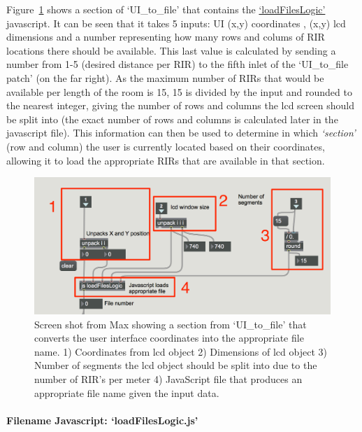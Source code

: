 \documentclass[../../main.tex]{subfiles}
\begin{document}
			Figure~\ref{locationsConvert} shows a section of `UI\_to\_file' that contains the \href{http://lt669.github.io/code/javascript/html/loadFilesLogic.html}{‘loadFilesLogic’} javascript. It can be seen that it takes 5 inputs: UI (x,y) coordinates , (x,y) lcd dimensions and a number representing how many rows and colums of \ac{RIR} locations there should be available. This last value is calculated by sending a number from 1-5 (desired distance per RIR) to the fifth inlet of the `UI\_to\_file patch' (on the far right). As the maximum number of RIRs that would be available per length of the room is 15, 15 is divided by the input and rounded to the nearest integer, giving the number of rows and columns the lcd screen should be split into (the exact number of rows and columns is calculated later in the javascript file). This information can then be used to determine in which \textit{‘section’} (row and column) the user is currently located based on their coordinates, allowing it to load the appropriate RIRs that are available in that section. 

			\begin{figure}[p]
				\centerline{\includegraphics[width=\textwidth]{Sections/Implementation/Max/images/Max/UI_to_file_edit_4.png}}
				\caption{Screen shot from Max showing a section from ‘UI\_to\_file’ that converts the user interface coordinates into the appropriate file name. 1) Coordinates from lcd object 2) Dimensions of lcd object 3) Number of segments the lcd object should be split into due to the number of \ac{RIR}'s per meter 4) JavaScript file that produces an appropriate file name given the input data.}
				\label{locationsConvert}
			\end{figure}

			\paragraph{Filename Javascript: `loadFilesLogic.js'}
\end{document}
